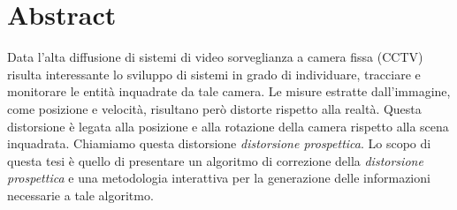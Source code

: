 \chapter*{Abstract}
Data l'alta diffusione di sistemi di video sorveglianza a camera fissa (CCTV) risulta interessante lo sviluppo di sistemi in grado di individuare, tracciare e monitorare le entità inquadrate da tale camera.
Le misure estratte dall'immagine, come posizione e velocità, risultano però distorte rispetto alla realtà. 
Questa distorsione è legata alla posizione e alla rotazione della camera rispetto alla scena inquadrata.
Chiamiamo questa distorsione \emph{distorsione prospettica}.
Lo scopo di questa tesi è quello di presentare un algoritmo di correzione della \emph{distorsione prospettica} e una metodologia interattiva per la generazione delle informazioni necessarie a tale algoritmo.
